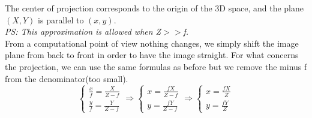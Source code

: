 The center of projection corresponds to the origin of the 3D space, and the plane $(X,Y)$ is parallel to $(x,y)$. 
\\\textit{PS: This approximation is allowed when Z$>>$f.}
\\From a computational point of view nothing changes, we simply shift the image plane from back to front in order to have the image straight. For what concerns the projection, we can use the same formulas as before but we remove the minus f from the denominator(too small).
\[
    \begin{cases}
        \frac{x}{f} = \frac{X}{Z-f} \\
        \frac{y}{f} = \frac{Y}{Z-f}
    \end{cases} \Rightarrow \begin{cases}
        x = \frac{fX}{Z-f} \\
        y = \frac{fY}{Z-f}
    \end{cases} \Rightarrow \begin{cases}
        x = \frac{fX}{Z} \\
        y = \frac{fY}{Z}
    \end{cases}
\]

